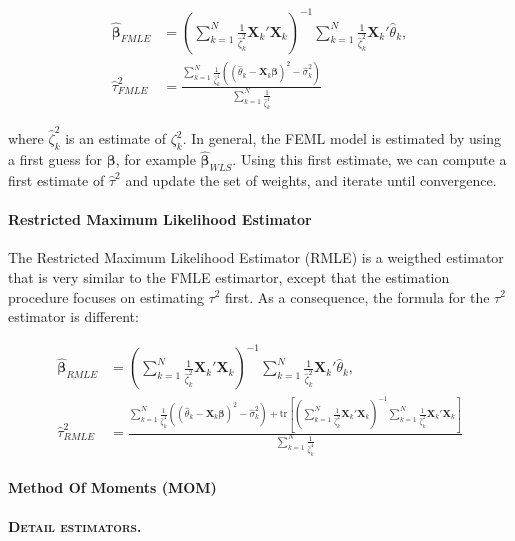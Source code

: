 \documentclass[]{book}
\let\oldparagraph\paragraph
\renewcommand{\paragraph}[1]{\oldparagraph{#1}\mbox{}}
\theoremstyle{definition}
\theoremstyle{definition}
\theoremstyle{definition}
\theoremstyle{remark}
\begin{document}
\begin{align*}
  \mathbf{\hat{\beta}}_{FMLE} & = \left(\sum_{k=1}^N\frac{1}{\hat{\zeta}^2_k}\mathbf{X}_k'\mathbf{X}_k\right)^{-1}\sum_{k=1}^N\frac{1}{\hat{\zeta}^2_k}\mathbf{X}_k'\hat{\theta}_k,\\
 \hat{\tau}^2_{FMLE} & = \frac{\sum_{k=1}^N\frac{1}{\hat{\zeta}^4_k}\left((\hat{\theta}_k -\mathbf{X}_k\mathbf{\beta})^2-\hat{\sigma}^2_k\right)}{\sum_{k=1}^N\frac{1}{\hat{\zeta}^4_k}}
\end{align*}

where \(\hat{\zeta}^2_k\) is an estimate of \(\zeta^2_{k}\). In general,
the FEML model is estimated by using a first guess for
\(\mathbf{\beta}\), for example \(\mathbf{\hat{\beta}}_{WLS}\). Using
this first estimate, we can compute a first estimate of \(\hat{\tau}^2\)
and update the set of weights, and iterate until convergence.

\paragraph{Restricted Maximum Likelihood
Estimator}\label{restricted-maximum-likelihood-estimator}

The Restricted Maximum Likelihood Estimator (RMLE) is a weigthed
estimator that is very similar to the FMLE estimartor, except that the
estimation procedure focuses on estimating \(\tau^2\) first. As a
consequence, the formula for the \(\tau^2\) estimator is different:

\begin{align*}
  \mathbf{\hat{\beta}}_{RMLE} & = \left(\sum_{k=1}^N\frac{1}{\hat{\zeta}^2_k}\mathbf{X}_k'\mathbf{X}_k\right)^{-1}\sum_{k=1}^N\frac{1}{\hat{\zeta}^2_k}\mathbf{X}_k'\hat{\theta}_k,\\
 \hat{\tau}^2_{RMLE} & = \frac{\sum_{k=1}^N\frac{1}{\hat{\zeta}^4_k}\left((\hat{\theta}_k -\mathbf{X}_k\mathbf{\beta})^2-\hat{\sigma}^2_k\right)
                          +\text{tr}\left[\left(\sum_{k=1}^N\frac{1}{\hat{\zeta}^2_k}\mathbf{X}_k'\mathbf{X}_k\right)^{-1}\sum_{k=1}^N\frac{1}{\hat{\zeta}^2_k}\mathbf{X}_k'\mathbf{X}_k\right]}
                          {\sum_{k=1}^N\frac{1}{\hat{\zeta}^4_k}}
\end{align*}

\paragraph{Method Of Moments (MOM)}\label{method-of-moments-mom}

\textbf{\textsc{Detail estimators.}}
\end{document}
